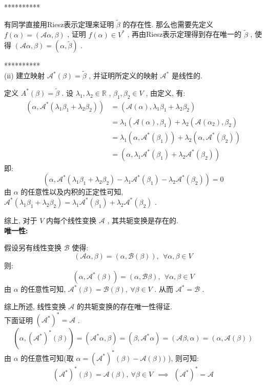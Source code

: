 \documentclass[11pt,a4paper,openany,oneside]{book}
\begin{document}
**********

有同学直接用Riesz表示定理来证明 $ \widetilde{\beta} $ 的存在性. 那么也需要先定义 $ f(\alpha) = (\mathcal{A}\alpha, \beta) $ , 证明 $ f(\alpha) \in V^* $ , 再由Riesz表示定理得到存在唯一的 $ \widetilde{\beta} $ , 使得 $ (\mathcal{A}\alpha, \beta) = (\alpha, \widetilde{\beta}) $ . 

**********  \\


(ii) 建立映射 $ \mathcal{A}^*(\beta) = \widetilde{\beta} $ , 并证明所定义的映射 $ \mathcal{A}^* $ 是线性的. 

定义 $ A^*(\beta) = \widetilde{\beta} $ . 设 $ \lambda_1, \lambda_2 \in \mathbb{R} $ ,  $ \beta_1, \beta_2 \in V $ , 由定义, 有:
\begin{align*}
(\alpha, \mathcal{A}^*(\lambda_1\beta_1+\lambda_2\beta_2)) &= (\mathcal{A}(\alpha), \lambda_1\beta_1 + \lambda_2\beta_2) \\
&= \lambda_1(\mathcal{A}(\alpha), \beta_1) + \lambda_2(\mathcal{A}(\alpha_2), \beta_2) \\
&= \lambda_1(\alpha, \mathcal{A}^*(\beta_1)) + \lambda_2(\alpha, \mathcal{A}^*(\beta_2)) \\
&= (\alpha, \lambda_1\mathcal{A}^*(\beta_1) + \lambda_2\mathcal{A}^*(\beta_2))
\end{align*}
即:
 $$  (\alpha, \mathcal{A}^*(\lambda_1\beta_1 + \lambda_2\beta_2) - \lambda_1\mathcal{A}^*(\beta_1)-\lambda_2\mathcal{A}^*(\beta_2)) =0  $$ 
由 $ \alpha $ 的任意性以及内积的正定性可知,  $ \mathcal{A}^*(\lambda_1\beta_1 + \lambda_2\beta_2) = \lambda_1\mathcal{A}^*(\beta_1) + \lambda_2\mathcal{A}^*(\beta_2) $ .

综上, 对于 $ V $ 内每个线性变换 $ \mathcal{A} $ , 其共轭变换是存在的. \\

\textbf{唯一性:}

假设另有线性变换 $ \mathcal{B} $ 使得:
 $$  (\mathcal{A}\alpha, \beta) = (\alpha, \mathcal{B}(\beta)), \ \ \forall \alpha, \beta \in V  $$ 
则:
 $$  (\alpha, \mathcal{A}^*(\beta)) = (\alpha, \mathcal{B}\beta), \ \ \forall \alpha, \beta \in V  $$ 
由 $ \alpha $ 的任意性可知,  $ \mathcal{A}^*(\beta) = \mathcal{B}(\beta),\ \forall \beta \in V $ . 从而 $ \mathcal{A}^* = \mathcal{B} $ . 

综上所述, 线性变换 $ \mathcal{A} $ 的共轭变换的存在唯一性得证.  \\

下面证明 $ (\mathcal{A}^*)^* = \mathcal{A} $ .
 $$  (\alpha, (\mathcal{A}^*)^*(\beta)) = (\mathcal{A}^*\alpha, \beta) = (\beta, \mathcal{A}^*\alpha) = (\mathcal{A}\beta, \alpha) = (\alpha, \mathcal{A}(\beta))  $$   
由 $ \alpha $ 的任意性可知(取 $ \alpha =(\mathcal{A}^*)^*(\beta)-\mathcal{A}(\beta))  $ ), 则可知:
 $$  (\mathcal{A}^*)^*(\beta) = \mathcal{A}(\beta), \ \forall \beta \in V \ \ \implies \ \ (\mathcal{A}^*)^* = \mathcal{A}   $$ 
\end{document}

